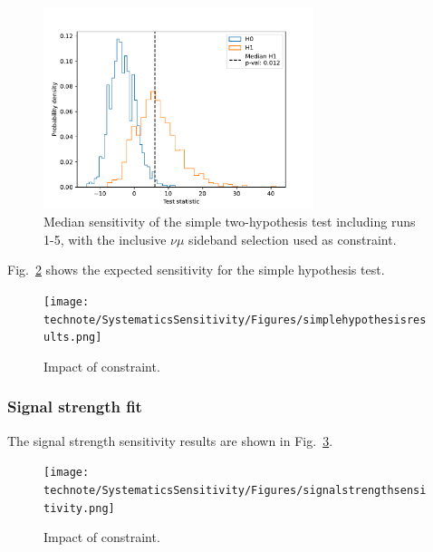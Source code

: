 \begin{figure}[h]
    \centering
    \includegraphics[width=0.7\textwidth]{technote/SystematicsSensitivity/Figures/two_hypothesis_test_runs_1-5_with_crt.pdf}
    \caption{Median sensitivity of the simple two-hypothesis test including runs 1-5, with the inclusive $\nu\mu$ sideband selection used as constraint.}
    \label{fig:simplehypothesis} 
\end{figure}

Fig.~\ref{fig:simplehypothesisresults} shows the expected sensitivity for the simple hypothesis test.

\begin{center}
\begin{figure}[h]
    \texttt{[image: technote/SystematicsSensitivity/Figures/simplehypothesisresults.png]}
    \caption{Impact of constraint.}
    \label{fig:simplehypothesisresults} 
\end{figure}
\end{center}

\newpage
\subsubsection{Signal strength fit}

The signal strength sensitivity results are shown in Fig.~\ref{fig:signalstrengthsensitivity}.
\begin{center}
\begin{figure}[h]
    \texttt{[image: technote/SystematicsSensitivity/Figures/signalstrengthsensitivity.png]}
    \caption{Impact of constraint.}
    \label{fig:signalstrengthsensitivity} 
\end{figure}
\end{center}

